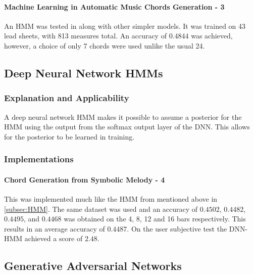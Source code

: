 \paragraph{Machine Learning in Automatic Music Chords Generation - 3} An HMM was tested in  along with other simpler models. It was trained on 43 lead sheets, with 813 measures total. 
An accuracy of $0.4844$ was achieved, however, a choice of only 7 chords were used unlike the usual 24.


\subsection{Deep Neural Network HMMs}

\label{subsec:DNN-HMMs}
\subsubsection{Explanation and Applicability} 

A deep neural network HMM makes it possible to assume a posterior for the HMM using the output from the softmax output layer of the DNN. 
This allows for the posterior to be learned in training.

\subsubsection{Implementations}

\paragraph{Chord Generation from Symbolic Melody - 4} This was implemented much like the HMM from  mentioned above in \cref{subsec:HMM}.
The same dataset was used and an accuracy of $0.4502$, $0.4482$, $0.4495$, and $0.4468$  was obtained on the 4, 8, 12 and 16 bars respectively. This results in an average accuracy of $0.4487$.
On the user subjective test the DNN-HMM achieved a score of $2.48$.

\subsection{Generative Adversarial Networks}

